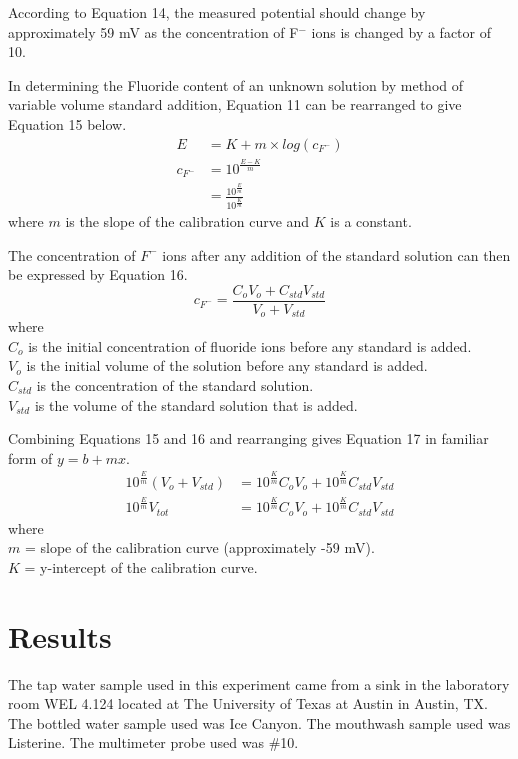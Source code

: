 \documentclass[journal=jacsat,manuscript=article,layout=twocolumn]{achemso}
\begin{document}
According to Equation 14, the measured potential should change by approximately
59 mV as the concentration of F$^-$ ions is changed by a factor of 10.

In determining the Fluoride content of an unknown solution by method of variable
volume standard addition, Equation 11 can be rearranged to give Equation 15
below.
\begin{equation}
\begin{aligned}
    E &= K + m\times log(c_{F^-}) \\
    c_{F^-} &= 10^{\frac{E-K}{m}}  \\
    &= \frac{10^{\frac{E}{m}}}{10^{\frac{K}{m}}}
\end{aligned}
\end{equation}
where $m$ is the slope of the calibration curve and $K$ is a constant.

The concentration of $F^-$ ions after any addition of the standard solution can
then be expressed by Equation 16.
\begin{equation}
    c_{F^-} = \frac{C_oV_o + C_{std}V_{std}}{V_o + V_{std}}
\end{equation}
where \\
$C_o$ is the initial concentration of fluoride ions before any standard is
added. \\
$V_o$ is the initial volume of the solution before any standard is added. \\
$C_{std}$ is the concentration of the standard solution. \\
$V_{std}$ is the volume of the standard solution that is added. 

Combining Equations 15 and 16 and rearranging gives Equation 17 in familiar
form of $y=b+mx$.
\begin{equation}
\begin{aligned}
    10^{\frac{E}{m}} (V_o + V_{std}) &= 10^{\frac{K}{m}}C_oV_o +
    10^{\frac{K}{m}}C_{std}V_{std} \\
    10^{\frac{E}{m}} V_{tot} &= 10^{\frac{K}{m}} C_oV_o +
    10^{\frac{K}{m}}C_{std}{V_{std}}
\end{aligned}
\end{equation}
where \\
$m$ = slope of the calibration curve (approximately -59 mV).  \\
$K$ = y-intercept of the calibration curve.


\section {Results}
The tap water sample used in this experiment came from a sink in the laboratory
room WEL 4.124 located at The University of Texas at Austin in Austin, TX.
The bottled water sample used was Ice Canyon. The mouthwash sample used was
Listerine. The multimeter probe used was \#10.
\end{document}
